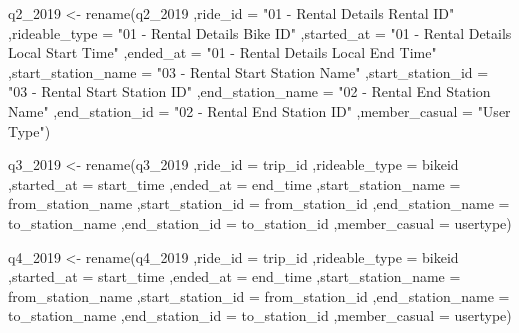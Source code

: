 \documentclass[
]{article}
\newenvironment{Shaded}{\begin{snugshade}}{\end{snugshade}}
\newcommand{\AttributeTok}[1]{\textcolor[rgb]{0.77,0.63,0.00}{#1}}
\newcommand{\FunctionTok}[1]{\textcolor[rgb]{0.00,0.00,0.00}{#1}}
\newcommand{\NormalTok}[1]{#1}
\newcommand{\OtherTok}[1]{\textcolor[rgb]{0.56,0.35,0.01}{#1}}
\newcommand{\StringTok}[1]{\textcolor[rgb]{0.31,0.60,0.02}{#1}}
\begin{document}
\begin{Shaded}
\begin{Highlighting}[]
\NormalTok{q2\_2019 }\OtherTok{\textless{}{-}} \FunctionTok{rename}\NormalTok{(q2\_2019}
\NormalTok{                   ,}\AttributeTok{ride\_id =} \StringTok{"01 {-} Rental Details Rental ID"}
\NormalTok{                   ,}\AttributeTok{rideable\_type =} \StringTok{"01 {-} Rental Details Bike ID"} 
\NormalTok{                   ,}\AttributeTok{started\_at =} \StringTok{"01 {-} Rental Details Local Start Time"}  
\NormalTok{                   ,}\AttributeTok{ended\_at =} \StringTok{"01 {-} Rental Details Local End Time"}  
\NormalTok{                   ,}\AttributeTok{start\_station\_name =} \StringTok{"03 {-} Rental Start Station Name"} 
\NormalTok{                   ,}\AttributeTok{start\_station\_id =} \StringTok{"03 {-} Rental Start Station ID"}
\NormalTok{                   ,}\AttributeTok{end\_station\_name =} \StringTok{"02 {-} Rental End Station Name"} 
\NormalTok{                   ,}\AttributeTok{end\_station\_id =} \StringTok{"02 {-} Rental End Station ID"}
\NormalTok{                   ,}\AttributeTok{member\_casual =} \StringTok{"User Type"}\NormalTok{)}

\NormalTok{q3\_2019 }\OtherTok{\textless{}{-}} \FunctionTok{rename}\NormalTok{(q3\_2019}
\NormalTok{                   ,}\AttributeTok{ride\_id =}\NormalTok{ trip\_id}
\NormalTok{                   ,}\AttributeTok{rideable\_type =}\NormalTok{ bikeid }
\NormalTok{                   ,}\AttributeTok{started\_at =}\NormalTok{ start\_time  }
\NormalTok{                   ,}\AttributeTok{ended\_at =}\NormalTok{ end\_time  }
\NormalTok{                   ,}\AttributeTok{start\_station\_name =}\NormalTok{ from\_station\_name }
\NormalTok{                   ,}\AttributeTok{start\_station\_id =}\NormalTok{ from\_station\_id }
\NormalTok{                   ,}\AttributeTok{end\_station\_name =}\NormalTok{ to\_station\_name }
\NormalTok{                   ,}\AttributeTok{end\_station\_id =}\NormalTok{ to\_station\_id }
\NormalTok{                   ,}\AttributeTok{member\_casual =}\NormalTok{ usertype)}

\NormalTok{q4\_2019 }\OtherTok{\textless{}{-}} \FunctionTok{rename}\NormalTok{(q4\_2019}
\NormalTok{                   ,}\AttributeTok{ride\_id =}\NormalTok{ trip\_id}
\NormalTok{                   ,}\AttributeTok{rideable\_type =}\NormalTok{ bikeid }
\NormalTok{                   ,}\AttributeTok{started\_at =}\NormalTok{ start\_time  }
\NormalTok{                   ,}\AttributeTok{ended\_at =}\NormalTok{ end\_time  }
\NormalTok{                   ,}\AttributeTok{start\_station\_name =}\NormalTok{ from\_station\_name }
\NormalTok{                   ,}\AttributeTok{start\_station\_id =}\NormalTok{ from\_station\_id }
\NormalTok{                   ,}\AttributeTok{end\_station\_name =}\NormalTok{ to\_station\_name }
\NormalTok{                   ,}\AttributeTok{end\_station\_id =}\NormalTok{ to\_station\_id }
\NormalTok{                   ,}\AttributeTok{member\_casual =}\NormalTok{ usertype)}
\end{Highlighting}
\end{Shaded}
\end{document}
